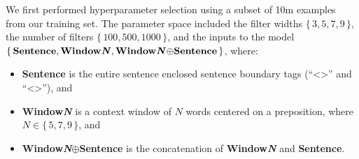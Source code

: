 We first performed hyperparameter selection using a subset of 10m examples from our training set.  The parameter space included the filter widths $\{\, 3,5,7,9 \,\}$, the number of filters $\{\, 100, 500, 1000 \,\}$, and the inputs to the model $\{\,
\text{\textbf{Sentence}}, \text{\textbf{Window\textit{N}}},
\text{\textbf{Window\textit{N}}$\oplus$\textbf{Sentence}} \,\}$, where:
\begin{itemize}
\item \textbf{Sentence} is the entire sentence enclosed sentence boundary tags (``\textless{}\textgreater'' and ``\textless{}\textgreater''), and
\item \textbf{Window\textit{N}} is a context window of $N$ words centered on a preposition, where $N \in \{\,5,7,9\,\}$, and 
\item \textbf{Window\textit{N}$\oplus$Sentence} is the concatenation of \textbf{Window\textit{N}} and \textbf{Sentence}.
\end{itemize}

